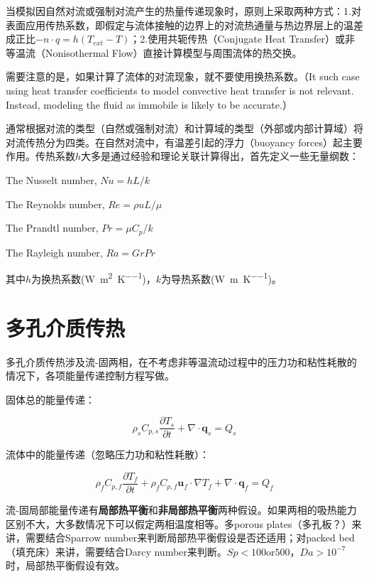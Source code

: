 当模拟因自然对流或强制对流产生的热量传递现象时，原则上采取两种方式：1.对表面应用传热系数，即假定与流体接触的边界上的对流热通量与热边界层上的温差成正比$-n\cdot q = h(T_{ext}-T)$；2.使用共轭传热（Conjugate Heat Transfer）或非等温流（Nonisothermal
Flow）直接计算模型与周围流体的热交换。

需要注意的是，如果计算了流体的对流现象，就不要使用换热系数。（It such case using heat transfer coefficients to model convective heat transfer is not relevant. Instead, modeling the fluid as immobile is likely to be accurate.）

通常根据对流的类型（自然或强制对流）和计算域的类型（外部或内部计算域）将对流传热分为四类。在自然对流中，有温差引起的浮力（buoyancy forces）起主要作用。传热系数$h$大多是通过经验和理论关联计算得出，首先定义一些无量纲数：

The Nusselt number, $Nu=hL/k$

The Reynolds number, $Re=\rho uL/\mu$

The Prandtl number, $Pr=\mu C_{p}/k$

The Rayleigh number, $Ra=GrPr$

其中$h$为换热系数(\si{\watt\per\square\meter\per\kelvin})，$k$为导热系数(\si{\watt\per\meter\per\kelvin})。

\section{多孔介质传热}
多孔介质传热涉及流-固两相，在不考虑非等温流动过程中的压力功和粘性耗散的情况下，各项能量传递控制方程写做。

固体总的能量传递：

\begin{equation}\label{solid-heat}
\rho_s C_{p,s} \frac{\partial T_s}{\partial t}+ \nabla\cdot\bm{q}_s = Q_s
\end{equation}

流体中的能量传递（忽略压力功和粘性耗散）：

\begin{equation}\label{fluid-heat}
\rho_f C_{p,f} \frac{\partial T_f}{\partial t} + \rho_f C_{p,f}\bm{u}_f\cdot\nabla T_f + \nabla\cdot\bm{q}_f = Q_f
\end{equation}

流-固局部能量传递有\textbf{局部热平衡}和\textbf{非局部热平衡}两种假设。如果两相的吸热能力区别不大，大多数情况下可以假定两相温度相等。多porous plates（多孔板？）来讲，需要结合Sparrow number来判断局部热平衡假设是否还适用；对packed bed（填充床）来讲，需要结合Darcy number来判断。$ Sp<100 \text{or} 500 $，$ Da>10^{-7} $时，局部热平衡假设有效。

